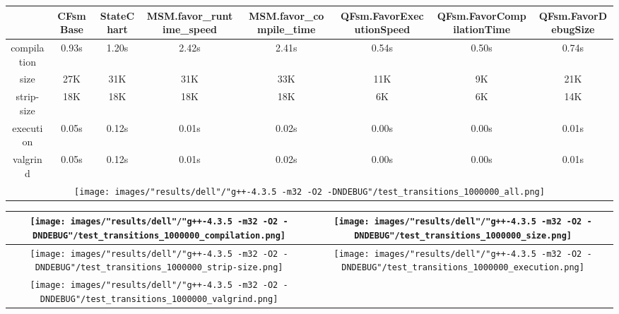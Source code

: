 \begin{landscape}
\begin{table}
\caption{"dell" [df6407d], g++-4.3.5 -m32 -O2 -DNDEBUG/test transitions 1000000}
\centering
\begin{longtable}{| c | c |c |c |c |c |c |c |}
\hline
& CFsmBase& StateChart& MSM.favor\_runtime\_speed& MSM.favor\_compile\_time& QFsm.FavorExecutionSpeed& QFsm.FavorCompilationTime& QFsm.FavorDebugSize\\
\hline
compilation & 0.93s & 1.20s & 2.42s & 2.41s & 0.54s & 0.50s & 0.74s\\
\hline
size & 27K & 31K & 31K & 33K & 11K & 9K & 21K\\
\hline
strip-size & 18K & 18K & 18K & 18K & 6K & 6K & 14K\\
\hline
execution & 0.05s & 0.12s & 0.01s & 0.02s & 0.00s & 0.00s & 0.01s\\
\hline
valgrind & 0.05s & 0.12s & 0.01s & 0.02s & 0.00s & 0.00s & 0.01s\\
\hline
\multicolumn{8}{|c|}{\texttt{[image: images/"results/dell"/"g++-4.3.5 -m32 -O2 -DNDEBUG"/test\_transitions\_1000000\_all.png]}}\\
\hline
\end{longtable}
\end{table}
\end{landscape}
\newpage
\begin{table}
\centering
\begin{longtable}{| c | c |}
\hline
\texttt{[image: images/"results/dell"/"g++-4.3.5 -m32 -O2 -DNDEBUG"/test\_transitions\_1000000\_compilation.png]}& \texttt{[image: images/"results/dell"/"g++-4.3.5 -m32 -O2 -DNDEBUG"/test\_transitions\_1000000\_size.png]}\\
\hline
\texttt{[image: images/"results/dell"/"g++-4.3.5 -m32 -O2 -DNDEBUG"/test\_transitions\_1000000\_strip-size.png]}& \texttt{[image: images/"results/dell"/"g++-4.3.5 -m32 -O2 -DNDEBUG"/test\_transitions\_1000000\_execution.png]}\\
\hline
\texttt{[image: images/"results/dell"/"g++-4.3.5 -m32 -O2 -DNDEBUG"/test\_transitions\_1000000\_valgrind.png]}& \\ \hline
\end{longtable}
\end{table}

